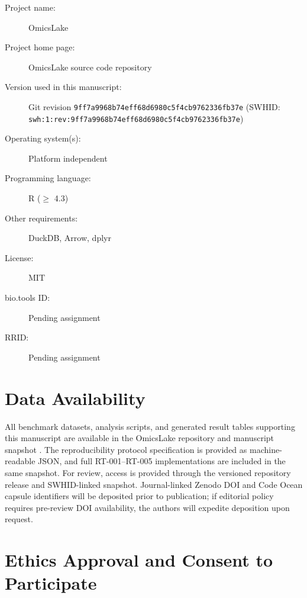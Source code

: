 \documentclass[11pt,a4paper]{article}
\begin{document}
\begin{description}
    \item[Project name:] OmicsLake
    \item[Project home page:] OmicsLake source code repository \citep{omicslake2026repo}
    \item[Version used in this manuscript:] Git revision \texttt{9ff7a9968b74eff68d6980c5f4cb9762336fb37e} (SWHID: \texttt{swh:1:rev:9ff7a9968b74eff68d6980c5f4cb9762336fb37e}) \citep{omicslake2026snapshot}
    \item[Operating system(s):] Platform independent
    \item[Programming language:] R ($\geq$ 4.3)
    \item[Other requirements:] DuckDB, Arrow, dplyr
    \item[License:] MIT
    \item[bio.tools ID:] Pending assignment
    \item[RRID:] Pending assignment
\end{description}

\section{Data Availability}

All benchmark datasets, analysis scripts, and generated result tables supporting this manuscript are available in the OmicsLake repository and manuscript snapshot \citep{omicslake2026repo, omicslake2026snapshot}. The reproducibility protocol specification is provided as machine-readable JSON, and full RT-001--RT-005 implementations are included in the same snapshot. For review, access is provided through the versioned repository release and SWHID-linked snapshot. Journal-linked Zenodo DOI and Code Ocean capsule identifiers will be deposited prior to publication; if editorial policy requires pre-review DOI availability, the authors will expedite deposition upon request.

\section{Ethics Approval and Consent to Participate}
\end{document}
